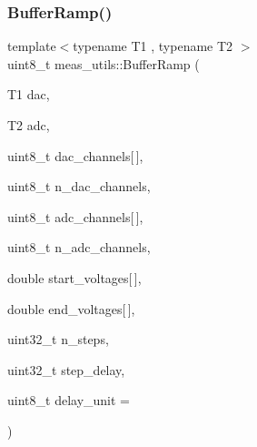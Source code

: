 \subsubsection{\texorpdfstring{Buffer\+Ramp()}{BufferRamp()}}
{\footnotesize\ttfamily template$<$typename T1 , typename T2 $>$ \\
uint8\+\_\+t meas\+\_\+utils\+::\+Buffer\+Ramp (\begin{DoxyParamCaption}\item[{T1}]{dac,  }\item[{T2}]{adc,  }\item[{uint8\+\_\+t}]{dac\+\_\+channels\mbox{[}$\,$\mbox{]},  }\item[{uint8\+\_\+t}]{n\+\_\+dac\+\_\+channels,  }\item[{uint8\+\_\+t}]{adc\+\_\+channels\mbox{[}$\,$\mbox{]},  }\item[{uint8\+\_\+t}]{n\+\_\+adc\+\_\+channels,  }\item[{double}]{start\+\_\+voltages\mbox{[}$\,$\mbox{]},  }\item[{double}]{end\+\_\+voltages\mbox{[}$\,$\mbox{]},  }\item[{uint32\+\_\+t}]{n\+\_\+steps,  }\item[{uint32\+\_\+t}]{step\+\_\+delay,  }\item[{uint8\+\_\+t}]{delay\+\_\+unit = {} }\end{DoxyParamCaption})}

